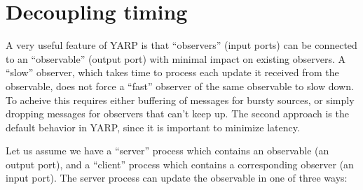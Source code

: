 
\section{Decoupling timing}

\label{sect:timing}

A very useful feature of YARP is that ``observers'' (input ports) can be connected to an
``observable'' (output port) with minimal impact on existing
observers.
%
A ``slow'' observer, which takes time to process each update it
received from the observable, does not force a ``fast'' observer of
the same observable to slow down.  To acheive this requires either buffering
of messages for bursty sources, or simply dropping messages for
observers that can't keep up.  The second approach is the default
behavior in YARP, since it is important to minimize latency.

Let us assume we have a ``server'' process which contains an
observable (an output port), and a ``client'' process
which contains a corresponding observer (an input port).
The server process can update the observable in one of three ways:

